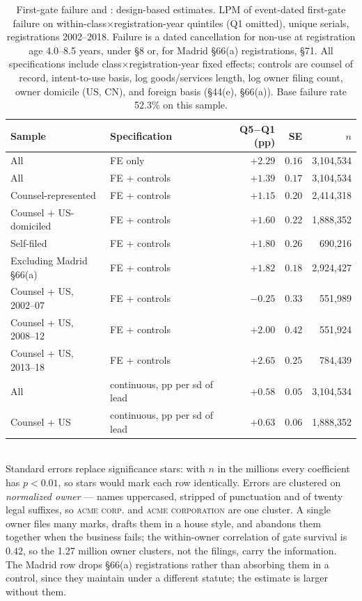 \begin{table}[h]\centering\small
\caption{First-gate failure and \dkl{}: design-based estimates.
LPM of event-dated first-gate failure on within-class$\times$registration-year
\dkl{} quintiles (Q1 omitted), unique serials, registrations 2002--2018.
Failure is a dated cancellation for non-use at registration age 4.0--8.5
years, under \S8 or, for Madrid \S66(a) registrations, \S71.
All specifications include class$\times$registration-year fixed effects; controls
are counsel of record, intent-to-use basis, log goods/services length,
log owner filing count, owner domicile (US, CN), and foreign basis
(\S44(e), \S66(a)). Base failure rate 52.3\% on this sample.}
\label{tab:gate_lpm}
\begin{tabular}{llrrr}
\toprule
Sample & Specification & Q5$-$Q1 (pp) & SE & $n$ \\
\midrule
All & FE only & $+2.29$ & $0.16$ & 3{,}104{,}534 \\
All & FE + controls & $+1.39$ & $0.17$ & 3{,}104{,}534 \\
Counsel-represented & FE + controls & $+1.15$ & $0.20$ & 2{,}414{,}318 \\
Counsel + US-domiciled & FE + controls & $+1.60$ & $0.22$ & 1{,}888{,}352 \\
Self-filed & FE + controls & $+1.80$ & $0.26$ & 690{,}216 \\
Excluding Madrid \S66(a) & FE + controls & $+1.82$ & $0.18$ & 2{,}924{,}427 \\
\midrule
Counsel + US, 2002--07 & FE + controls & $-0.25$ & $0.33$ & 551{,}989 \\
Counsel + US, 2008--12 & FE + controls & $+2.00$ & $0.42$ & 551{,}924 \\
Counsel + US, 2013--18 & FE + controls & $+2.65$ & $0.25$ & 784{,}439 \\
\midrule
All & continuous, pp per sd of lead & $+0.58$ & $0.05$ & 3{,}104{,}534 \\
Counsel + US & continuous, pp per sd of lead & $+0.63$ & $0.06$ & 1{,}888{,}352 \\
\bottomrule
\end{tabular}
\\[0.3em]\footnotesize Standard errors replace significance stars: with $n$
in the millions every coefficient has $p < 0.01$, so stars would mark each
row identically. Errors are clustered on \emph{normalized owner} --- names
uppercased, stripped of punctuation and of twenty legal suffixes, so
\textsc{acme corp.} and \textsc{acme corporation} are one cluster. A single
owner files many marks, drafts them in a house style, and abandons them
together when the business fails; the within-owner correlation of gate
survival is $0.42$, so the 1.27 million owner clusters, not the filings,
carry the information. The Madrid row drops \S66(a) registrations rather
than absorbing them in a control, since they maintain under a different
statute; the estimate is larger without them.
\end{table}

